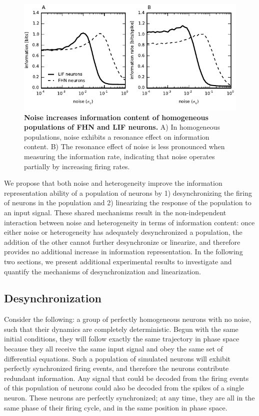 \documentclass[12pt]{article}
\begin{document}
\begin{figure}
  \ifx\hidefigures\undefined
    \centering
    \includegraphics[width=\textwidth]{figure4_infonoise.pdf}
  \fi
  \caption{
    \textbf{Noise increases information content of homogeneous populations of FHN and LIF neurons.} A) In homogeneous populations, noise exhibits a resonance effect on information content. B) The resonance effect of noise is less pronounced when measuring the information rate, indicating that noise operates partially by increasing firing rates.
  }
  \label{fig:infonoise}
\end{figure}

We propose that both noise and heterogeneity improve the information representation ability of a population of neurons by 1) desynchronizing the firing of neurons in the population and 2) linearizing the response of the population to an input signal. These shared mechanisms result in the non-independent interaction between noise and heterogeneity in terms of information content: once either noise or heterogeneity has adequately desynchronized a population, the addition of the other cannot further desynchronize or linearize, and therefore provides no additional increase in information representation. In the following two sections, we present additional experimental results to investigate and quantify the mechanisms of desynchronization and linearization.


\subsection{Desynchronization}
\label{scn:desync}

Consider the following: a group of perfectly homogeneous neurons with no noise, such that their dynamics are completely deterministic. Begun with the same initial conditions, they will follow exactly the same trajectory in phase space because they all receive the same input signal and obey the same set of differential equations. Such a population of simulated neurons will exhibit perfectly synchronized firing events, and therefore the neurons contribute redundant information. Any signal that could be decoded from the firing events of this population of neurons could also be decoded from the spikes of a single neuron. These neurons are perfectly synchronized; at any time, they are all in the same phase of their firing cycle, and in the same position in phase space.
\end{document}
